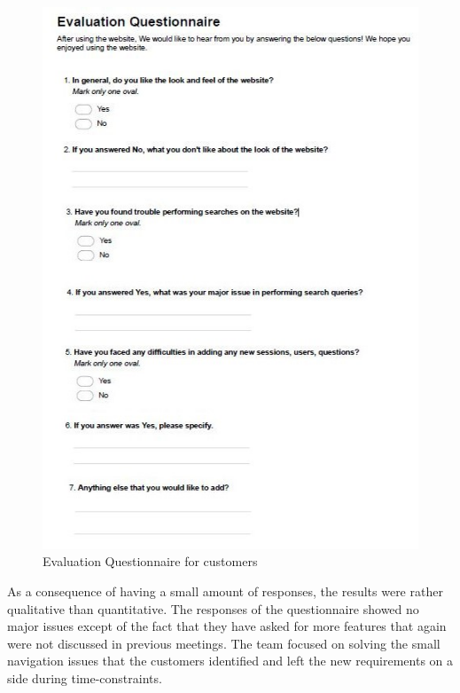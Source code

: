 \documentclass{l3proj}
\begin{document}
\begin{figure}[h]
\centerline{\includegraphics[width=\textwidth, height=\textheight, keepaspectratio]{evalQuestCustomers.jpg}}
\caption{Evaluation Questionnaire for customers }
 \label{fig:evalQuest}
\end{figure}

As a consequence of having a small amount of responses, the results were rather qualitative than quantitative. The responses of the questionnaire showed no major issues except of the fact that they have asked for more features that again were not discussed in previous meetings. The team focused on solving the small navigation issues that the customers identified and left the new requirements on a side during time-constraints.
\end{document}
